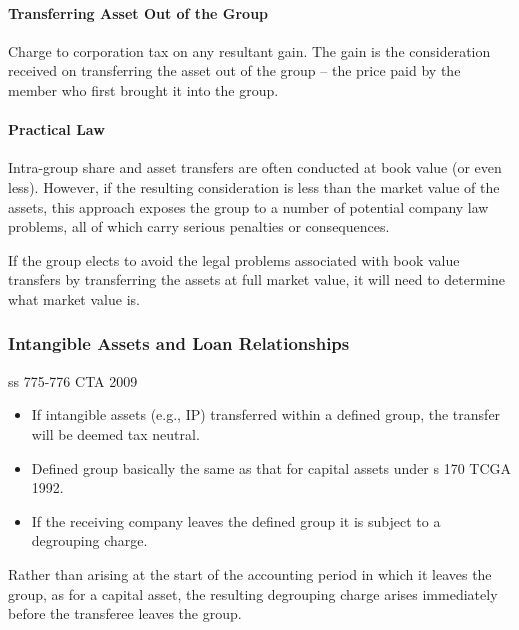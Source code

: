 \documentclass[
]{article}
\newenvironment{Shaded}{}{}
\newcommand{\NormalTok}[1]{#1}
\providecommand{\tightlist}{%
  \setlength{\itemsep}{0pt}\setlength{\parskip}{0pt}}
\begin{document}
\hypertarget{transferring-asset-out-of-the-group}{%
\paragraph{Transferring Asset Out of the
Group}\label{transferring-asset-out-of-the-group}}

Charge to corporation tax on any resultant gain. The gain is the
consideration received on transferring the asset out of the group -- the
price paid by the member who first brought it into the group.

\hypertarget{practical-law}{%
\paragraph{Practical Law}\label{practical-law}}

Intra-group share and asset transfers are often conducted at book value
(or even less). However, if the resulting consideration is less than the
market value of the assets, this approach exposes the group to a number
of potential company law problems, all of which carry serious penalties
or consequences.

If the group elects to avoid the legal problems associated with book
value transfers by transferring the assets at full market value, it will
need to determine what market value is.

\hypertarget{intangible-assets-and-loan-relationships}{%
\subsubsection{Intangible Assets and Loan
Relationships}\label{intangible-assets-and-loan-relationships}}

ss 775-776 CTA 2009

\begin{itemize}
\tightlist
\item
  If intangible assets (e.g., IP) transferred within a defined group,
  the transfer will be deemed tax neutral.
\item
  Defined group basically the same as that for capital assets under s
  170 TCGA 1992.
\item
  If the receiving company leaves the defined group it is subject to a
  degrouping charge.
\end{itemize}

\begin{Shaded}
\begin{Highlighting}[]
\NormalTok{Rather than arising at the start of the accounting period in which it leaves the group, as for a capital asset, the resulting degrouping charge arises immediately before the transferee leaves the group.}
\end{Highlighting}
\end{Shaded}
\end{document}
